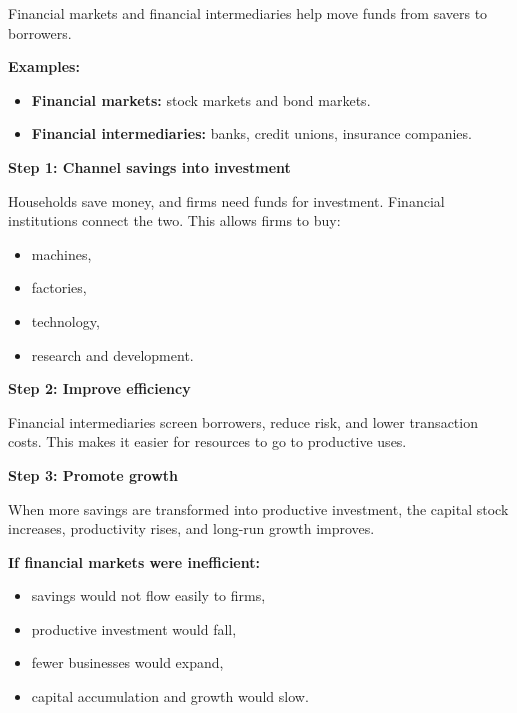 \documentclass[12pt]{article}
\begin{document}
\begin{enumerate}[label=\textbf{\arabic*.}]
Financial markets and financial intermediaries help move funds from savers to borrowers.

\textbf{Examples:}
\begin{itemize}
    \item \textbf{Financial markets:} stock markets and bond markets.
    \item \textbf{Financial intermediaries:} banks, credit unions, insurance companies.
\end{itemize}

\textbf{Step 1: Channel savings into investment}

Households save money, and firms need funds for investment. Financial institutions connect the two. This allows firms to buy:
\begin{itemize}
    \item machines,
    \item factories,
    \item technology,
    \item research and development.
\end{itemize}

\textbf{Step 2: Improve efficiency}

Financial intermediaries screen borrowers, reduce risk, and lower transaction costs. This makes it easier for resources to go to productive uses.

\textbf{Step 3: Promote growth}

When more savings are transformed into productive investment, the capital stock increases, productivity rises, and long-run growth improves.

\textbf{If financial markets were inefficient:}
\begin{itemize}
    \item savings would not flow easily to firms,
    \item productive investment would fall,
    \item fewer businesses would expand,
    \item capital accumulation and growth would slow.
\end{itemize}

\end{enumerate}
\end{document}
